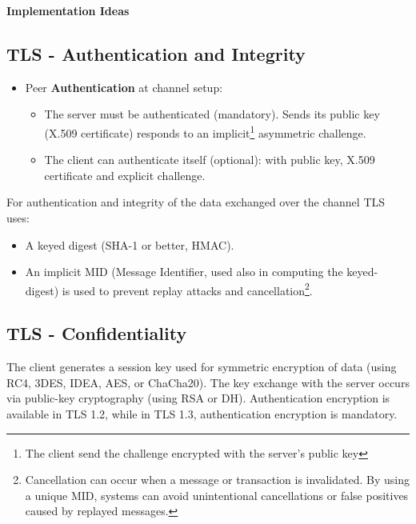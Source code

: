 \begin{center}
    \textbf{Implementation Ideas}
\end{center}

\subsection{TLS - Authentication and Integrity}
\begin{itemize}
    \item Peer \textbf{Authentication} at channel setup: 
    \begin{itemize}
        \item The server must be authenticated (mandatory). Sends its public key (X.509 certificate)  responds to an implicit\footnote{The client send the challenge encrypted with the server's public key} asymmetric challenge.
        \item The client can authenticate itself (optional): with public key, X.509 certificate and explicit challenge.
    \end{itemize}
\end{itemize}

For authentication and integrity of the data exchanged over the channel TLS uses:
\begin{itemize}
    \item A keyed digest (SHA-1 or better, HMAC).
    \item An implicit MID (Message Identifier, used also in computing the keyed-digest) is used to prevent replay attacks and cancellation\footnote{Cancellation can occur when a message or transaction is invalidated. By using a unique MID, systems can avoid unintentional cancellations or false positives caused by replayed messages.}.
\end{itemize}

\subsection{TLS - Confidentiality}

The client generates a session key used for symmetric encryption of data (using RC4, 3DES, IDEA, AES, or ChaCha20). The key exchange with the server occurs via public-key cryptography (using RSA or DH). Authentication encryption is available in TLS 1.2, while in TLS 1.3, authentication encryption is mandatory.

